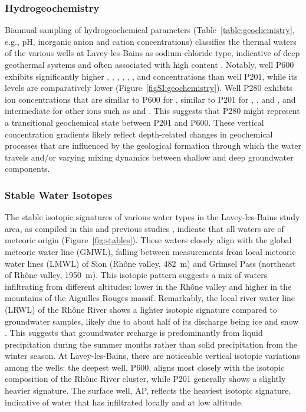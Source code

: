 \subsubsection{Hydrogeochemistry}
Biannual sampling of hydrogeochemical parameters (Table~\ref{table:geochemistry}, e.g., pH, inorganic anion and cation concentrations) classifies the thermal waters of the various wells at Lavey-les-Bains as sodium-chloride type, indicative of deep geothermal systems and often associated with high  content \citep{gupta2007exploration}.
Notably, well P600 exhibits significantly higher , , , , , , and  concentrations than well P201, while its  levels are comparatively lower (Figure~\ref{figSI:geochemistry}).
Well P280 exhibits ion concentrations that are similar to P600 for , similar to P201 for , , and , and intermediate for other ions such as  and .
This suggests that P280 might represent a transitional geochemical state between P201 and P600.
These vertical concentration gradients likely reflect depth-related changes in geochemical processes that are influenced by the geological formation through which the water travels and/or varying mixing dynamics between shallow and deep groundwater components.


\FloatBarrier %

\afterpage{%
\clearpage

\clearpage
}

\subsubsection{Stable Water Isotopes}
The stable isotopic signatures of various water types in the Lavey-les-Bains study area, as compiled in this and previous studies \citep{iaea2024GNIP, iaea2024GNIR, naqua2024isot, sonney2010database, vuataz1982hydrogeologie}, indicate that all waters are of meteoric origin (Figure~\ref{fig:stables}).
These waters closely align with the global meteoric water line (GMWL), falling between measurements from local meteoric water lines (LMWL) of Sion (Rhône valley, \SI{482}{\metre}) and Grimsel Pass (northeast of Rhône valley, \SI{1950}{\metre}).
This isotopic pattern suggests a mix of waters infiltrating from different altitudes: lower in the Rhône valley and higher in the mountains of the Aiguilles Rouges massif.
Remarkably, the local river water line (LRWL) of the Rhône River shows a lighter isotopic signature compared to groundwater samples, likely due to about half of its discharge being ice and snow \citep{freudiger2020quantifying}.
This suggests that groundwater recharge is predominantly from liquid precipitation during the summer months rather than solid precipitation from the winter season.
At Lavey-les-Bains, there are noticeable vertical isotopic variations among the wells: the deepest well, P600, aligns most closely with the isotopic composition of the Rhône River cluster, while P201 generally shows a slightly heavier signature.
The surface well, AP, reflects the heaviest isotopic signature, indicative of water that has infiltrated locally and at low altitude.

